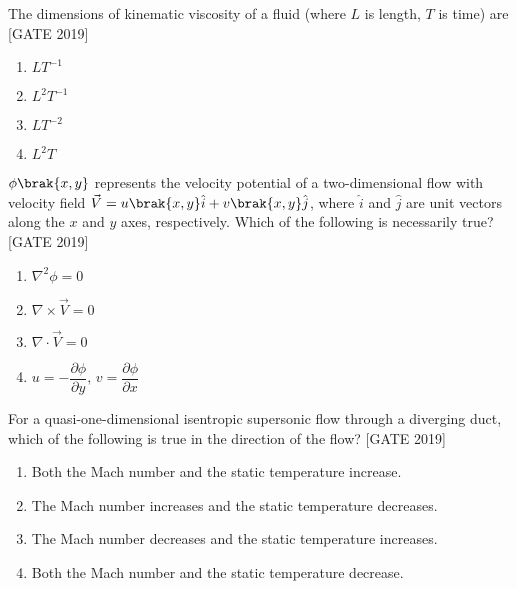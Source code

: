 \iffalse
\title{2019-AE}
\author{EE24BTECH11020 -  Ellanti Rohith}
\section{ae}
\chapter{2019}
\fi

    \item The dimensions of kinematic viscosity of a fluid (where $L$ is length, $T$ is time) are
    \hfill{[GATE 2019]}
    \begin{multicols}{4}
        \begin{enumerate}
            \item $LT^{-1}$
            \item $L^2T^{-1}$
            \item $LT^{-2}$
            \item $L^2T$
        \end{enumerate}
    \end{multicols}

    \item $\phi\brak{x, y}$ represents the velocity potential of a two-dimensional flow with velocity field $\vec{V} = u\brak{x, y} \hat{i} + v\brak{x, y} \hat{j}$, where $\hat{i}$ and $\hat{j}$ are unit vectors along the $x$ and $y$ axes, respectively. Which of the following is necessarily true?
    \hfill{[GATE 2019]}
    \begin{multicols}{2}
        \begin{enumerate}
            \item $\nabla^2 \phi = 0$
            \item $\nabla \times \vec{V} = 0$
            \item $\nabla \cdot \vec{V} = 0$
            \item $u = -\dfrac{\partial \phi}{\partial y}, \, v = \dfrac{\partial \phi}{\partial x}$
        \end{enumerate}
    \end{multicols}

    \item For a quasi-one-dimensional isentropic supersonic flow through a diverging duct, which of the following is true in the direction of the flow?
    \hfill{[GATE 2019]}

        \begin{enumerate}
            \item Both the Mach number and the static temperature increase.
            \item The Mach number increases and the static temperature decreases.
            \item The Mach number decreases and the static temperature increases.
            \item Both the Mach number and the static temperature decrease.\\
        \end{enumerate}
        
